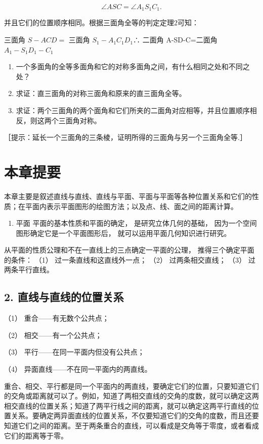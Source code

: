 \[
\angle A S C = \angle A _ {1} S _ {1} C _ {1}.
\]

并且它们的位置顺序相同。根据三面角全等的判定定理2可知：

三面角 \(S - ACD =\) 三面角 \(S_{1} - A_{1}C_{1}D_{1}\)∴ 二面角
A-SD-C=二面角 \(A_{1}-S_{1}D_{1}-C_{1}\)

\begin{enumerate}
\item
  一个多面角的全等多面角和它的对称多面角之间，有什么相同之处和不同之处？
\item
  求证：直三面角的对称三面角和原来的直三面角全等。
\item
  求证：两个三面角的两个面角和它们所夹的二面角对应相等，并且位置顺序相反，则这两个三面角对称。
\end{enumerate}

［提示：延长一个三面角的三条棱，证明所得的三面角与另一个三面角全等.］

\section{本章提要}

本章主要是叙述直线与直线、直线与平面、平面与平面等各种位置关系和它们的性质；在平面内表示平面图形的绘图方法；以及点、线、面之间的距离计算。

\begin{enumerate}
\item
  平面 平面的基本性质和平面的确定， 是研究立体几何的基础，
  因为一个空间图形确定它是一个平面图形后，
  就可以运用平面几何知识进行研究。
\end{enumerate}

从平面的性质公理和不在一直线上的三点确定一平面的公理，
推得三个确定平面的条件： （1） 过一条直线和这直线外一点； （2）
过两条相交直线； （3） 过两条平行直线。

\subsection{2.
直线与直线的位置关系}

（1） 重合------有无数个公共点；

（2） 相交------有一个公共点；

（3） 平行------在同一平面内但没有公共点；

（4） 异面直线------不在同一平面内的两直线。

重合、相交、平行都是同一个平面内的两直线，要确定它们的位置，只要知道它们的交角或距离就可以了。例如，知道了两相交直线的交角的度数，就可以确定这两相交直线的位置关系；知道了两平行线之间的距离，就可以确定这两平行直线的位置关系。要确定两异面直线的位置关系，不仅要知道它们的交角的度数，而且还要知道它们之间的距离。至于两条重合的直线，可以看成是交角等于零度，或者看成它们的距离等于零。


